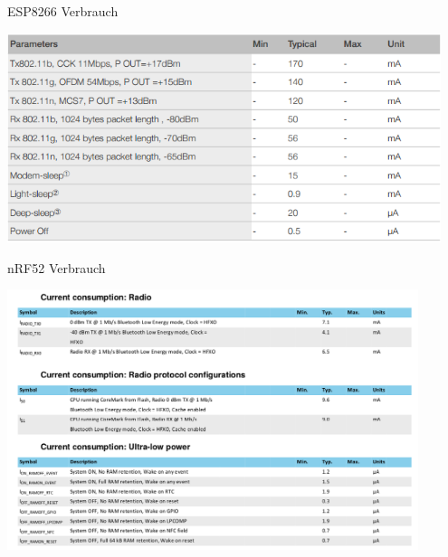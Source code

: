\documentclass[18pt]{beamer}
\begin{document}
\begin{frame}{ESP8266 Verbrauch}%
	\begin{minipage}[t][\textheight][t]{\textwidth}
		\centering
		\includegraphics[width=0.95\textwidth]{images/esppower.png}
	\end{minipage}
\end{frame}

\begin{frame}{nRF52 Verbrauch}%
	\begin{minipage}[t][\textheight][t]{\textwidth}
		\centering
		\includegraphics[width=0.9\textwidth]{images/nrf52consumption.png}
	\end{minipage}
\end{frame}
\end{document}
